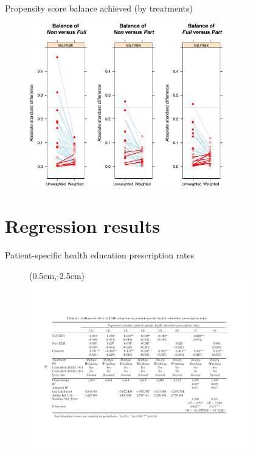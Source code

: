 \documentclass[10pt, compress]{beamer}
\begin{document}
\begin{frame}{Propensity score balance achieved (by treatments)}

\begin{figure}
\centering

   \includegraphics[width= 0.75\textwidth]{psdiag4.pdf}

\end{figure}
\end{frame}

\section{Regression results}

\begin{frame}{Patient-specific health education prescription rates}

\begin{figure}
\centering
\begin{textblock*}{8.5cm}(0.5cm,-2.5cm)
   \includegraphics[width= 0.85\textwidth]{61.pdf}
\end{textblock*}
\end{figure}


\end{frame}
\end{document}
